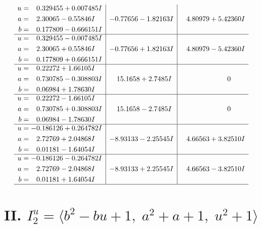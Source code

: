 \documentclass[1p]{elsarticle_modified}
\theoremstyle{definition}
\begin{document}
$$\begin{array}{c|c|c}
\begin{aligned}
u &= \phantom{-}0.329455 + 0.007485 I \\
a &= \phantom{-}2.30065 - 0.55846 I \\
b &= \phantom{-}0.177809 - 0.666151 I\end{aligned}
 & -0.77656 - 1.82163 I & \phantom{-}4.80979 + 5.42360 I \\ \hline\begin{aligned}
u &= \phantom{-}0.329455 - 0.007485 I \\
a &= \phantom{-}2.30065 + 0.55846 I \\
b &= \phantom{-}0.177809 + 0.666151 I\end{aligned}
 & -0.77656 + 1.82163 I & \phantom{-}4.80979 - 5.42360 I \\ \hline\begin{aligned}
u &= \phantom{-}0.22272 + 1.66105 I \\
a &= \phantom{-}0.730785 - 0.308803 I \\
b &= \phantom{-}0.06984 + 1.78630 I\end{aligned}
 & \phantom{-}15.1658 + 2.7485 I & \phantom{-0.000000 } 0 \\ \hline\begin{aligned}
u &= \phantom{-}0.22272 - 1.66105 I \\
a &= \phantom{-}0.730785 + 0.308803 I \\
b &= \phantom{-}0.06984 - 1.78630 I\end{aligned}
 & \phantom{-}15.1658 - 2.7485 I & \phantom{-0.000000 } 0 \\ \hline\begin{aligned}
u &= -0.186126 + 0.264782 I \\
a &= \phantom{-}2.72769 + 2.04868 I \\
b &= \phantom{-}0.01181 - 1.64054 I\end{aligned}
 & -8.93133 - 2.25545 I & \phantom{-}4.66563 + 3.82510 I \\ \hline\begin{aligned}
u &= -0.186126 - 0.264782 I \\
a &= \phantom{-}2.72769 - 2.04868 I \\
b &= \phantom{-}0.01181 + 1.64054 I\end{aligned}
 & -8.93133 + 2.25545 I & \phantom{-}4.66563 - 3.82510 I\\
 \hline 
 \end{array}$$\newpage\newpage\renewcommand{\arraystretch}{1}
\centering \section*{II. $I^u_{2}= \langle b^2- b u+1,\;a^2+a+1,\;u^2+1 \rangle$}
\end{document}
